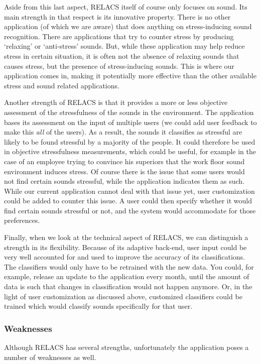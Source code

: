 \documentclass[a4paper]{article}
\begin{document}
Aside from this last aspect, RELACS itself of course only focuses on sound. Its main strength in that respect is its innovative property. There is no other application (of which we are aware) that does anything on stress-inducing sound recognition. There are applications that try to counter stress by producing `relaxing' or `anti-stress' sounds. But, while these application may help reduce stress in certain situation, it is often not the absence of relaxing sounds that causes stress, but the presence of stress-inducing sounds. This is where our application comes in, making it potentially more effective than the other available stress and sound related applications.

Another strength of RELACS is that it provides a more or less objective assessment of the stressfulness of the sounds in the environment. The application bases its assessment on the input of multiple users (we could add user feedback to make this \textit{all} of the users). As a result, the sounds it classifies as stressful are likely to be found stressful by a majority of the people. It could therefore be used in objective stressfulness measurements, which could be useful, for example in the case of an employee trying to convince his superiors that the work floor sound environment induces stress. Of course there is the issue that some users would not find certain sounds stressful, while the application indicates them as such. While our current application cannot deal with that issue yet, user customization could be added to counter this issue. A user could then specify whether it would find certain sounds stressful or not, and the system would accommodate for those preferences.

Finally, when we look at the technical aspect of RELACS, we can distinguish a strength in its flexibility. Because of its adaptive back-end, user input could be very well accounted for and used to improve the accuracy of its classifications. The classifiers would only have to be retrained with the new data. You could, for example, release an update to the application every month, until the amount of data is such that changes in classification would not happen anymore. Or, in the light of user customization as discussed above, customized classifiers could be trained which would classify sounds specifically for that user.

\subsubsection{Weaknesses}
Although RELACS has several strengths, unfortunately the application poses a number of weaknesses as well.
\end{document}
